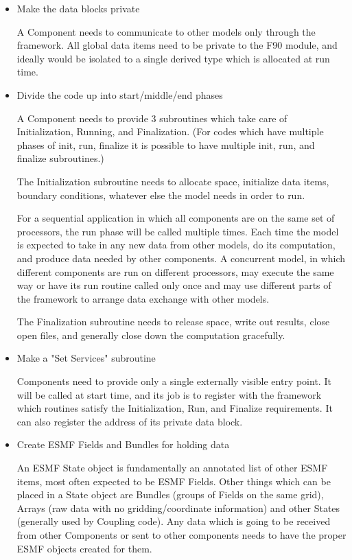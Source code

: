 \begin{itemize}
\item Make the data blocks private 

A Component needs to communicate to other models only through the
framework.  All global data items need to be private to the F90 module,
and ideally would be isolated to a single derived type which is allocated
at run time.   

\item Divide the code up into start/middle/end phases 

A Component needs to provide 3 subroutines which take care of
Initialization, Running, and Finalization.  (For codes which have
multiple phases of init, run, finalize it is possible to have
multiple init, run, and finalize subroutines.)

The Initialization subroutine needs to allocate space, initialize
data items, boundary conditions, whatever else the model needs in
order to run.

For a sequential application in which all components are on the same
set of processors, the run phase will
be called multiple times.  Each time the model is expected to take in
any new data from other models, do its computation, and produce data
needed by other components.   A concurrent model, in which different
components are run on different processors, may execute the same 
way or have its run routine called
only once and may use different parts of the framework to arrange
data exchange with other models.

The Finalization subroutine needs to release space, write out results,
close open files, and generally close down the computation gracefully.

\item Make a "Set Services" subroutine 

Components need to provide only a single externally visible entry point.
It will be called at start time, and its job is to register with the
framework which routines satisfy the Initialization, Run, and Finalize
requirements.  It can also register the address of its private data block.

\item Create ESMF Fields and Bundles for holding data

An ESMF State object is fundamentally an annotated list of other
ESMF items, most often expected to be ESMF Fields.  Other things
which can be placed in a State object are Bundles (groups of Fields
on the same grid), Arrays (raw data with no gridding/coordinate information)
and other States (generally used by Coupling code).  Any data which is
going to be received from other Components or sent to other components
needs to have the proper ESMF objects created for them.


\end{itemize}
